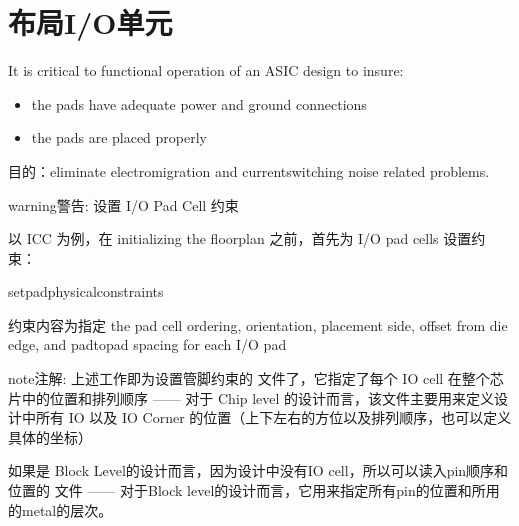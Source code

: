 \documentclass[letterpaper,10pt,english]{sphinxmanual}
\begin{document}
\section{布局I/O单元}
\label{\detokenize{chapter5/_u5e03_u5c40IO_u5355_u5143:i-o}}\label{\detokenize{chapter5/_u5e03_u5c40IO_u5355_u5143::doc}}
\sphinxAtStartPar
It is critical to functional operation of an ASIC design to insure:
\begin{itemize}
\item {} 
\sphinxAtStartPar
the pads have adequate power and ground connections

\item {} 
\sphinxAtStartPar
the pads are placed properly

\end{itemize}

\sphinxAtStartPar
目的：eliminate electromigration and current\sphinxhyphen{}switching noise related problems.

\begin{sphinxadmonition}{warning}{警告:}
\sphinxAtStartPar
设置 I/O Pad Cell 约束
\end{sphinxadmonition}

\sphinxAtStartPar
以 ICC 为例，在 initializing the floorplan 之前，首先为 I/O pad cells 设置约束：

\begin{sphinxVerbatim}[commandchars=\\\{\},numbers=left,firstnumber=1,stepnumber=1]
set\PYGZus{}pad\PYGZus{}physical\PYGZus{}constraints
\end{sphinxVerbatim}

\sphinxAtStartPar
约束内容为指定 the pad cell ordering, orientation, placement side, offset from die edge, and pad\sphinxhyphen{}to\sphinxhyphen{}pad spacing for each I/O pad

\begin{figure}[htbp]
\centering

\noindent{}
\end{figure}

\begin{sphinxadmonition}{note}{注解:}
\sphinxAtStartPar
上述工作即为设置管脚约束的  文件了，它指定了每个 IO cell 在整个芯片中的位置和排列顺序 —— 对于 Chip level 的设计而言，该文件主要用来定义设计中所有 IO 以及 IO Corner 的位置（上下左右的方位以及排列顺序，也可以定义具体的坐标）

\sphinxAtStartPar
如果是 Block Level的设计而言，因为设计中没有IO cell，所以可以读入pin顺序和位置的  文件 —— 对于Block level的设计而言，它用来指定所有pin的位置和所用的metal的层次。
\end{sphinxadmonition}
\end{document}
